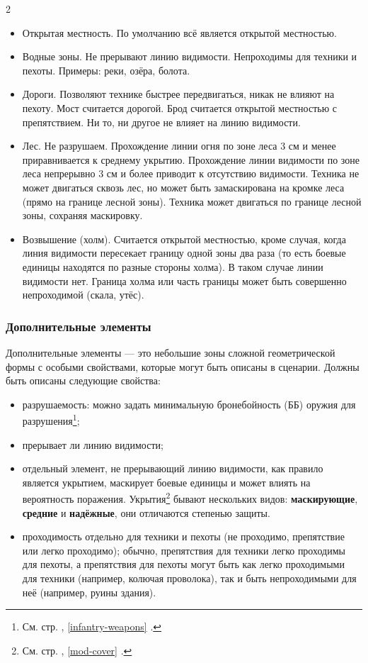 \documentclass[twoside]{article}
\begin{document}
\begin{multicols}{2}
\begin{itemize}
\item
  Открытая местность. По умолчанию всё является открытой местностью.
\item
  Водные зоны. Не прерывают линию видимости. Непроходимы для техники и
  пехоты. Примеры: реки, озёра, болота.
\item
  Дороги. Позволяют технике быстрее передвигаться, никак не влияют на
  пехоту. Мост считается дорогой. Брод считается открытой местностью с
  препятствием. Ни то, ни другое не влияет на линию видимости.
\item
  Лес. Не разрушаем. Прохождение линии огня по зоне леса 3 см и менее
  приравнивается к среднему укрытию. Прохождение линии
  видимости по зоне леса непрерывно 3 см и более приводит к отсутствию
  видимости. Техника не может двигаться сквозь лес, но может быть
  замаскирована на кромке леса (прямо на границе лесной зоны).
  Техника может двигаться по границе лесной зоны, сохраняя
  маскировку.
\item
  Возвышение (холм). Считается открытой местностью, кроме случая, когда
  линия видимости пересекает границу одной зоны два раза (то есть боевые
  единицы находятся по разные стороны холма). В таком случае линии
  видимости нет. Граница холма или часть границы может быть совершенно
  непроходимой (скала, утёс).
\end{itemize}

\subsubsection{Дополнительные элементы}\label{elements}

Дополнительные элементы --- это небольшие зоны сложной геометрической формы с особыми свойствами,
которые могут быть описаны в сценарии. Должны быть описаны следующие свойства:

\begin{itemize}
\item
  разрушаемость: можно задать минимальную бронебойность (ББ) оружия для
  разрушения\footnote{См. стр. \pageref{infantry-weapons}, \ref{infantry-weapons} .};
\item
  прерывает ли линию видимости;
\item
  отдельный элемент, не прерывающий линию видимости, как правило
  является укрытием, маскирует боевые единицы и может
  влиять на вероятность поражения. Укрытия\footnote{См. стр. \pageref{mod-cover}, \ref{mod-cover} .} бывают нескольких видов:
  \textbf{маскирующие}, \textbf{средние} и \textbf{надёжные}, они
  отличаются степенью защиты.
\item
  проходимость отдельно для техники и пехоты (не проходимо,
  препятствие или легко проходимо); обычно,
  препятствия для техники легко проходимы для пехоты, а
  препятствия для пехоты могут быть как легко проходимыми для
  техники (например, колючая проволока), так и быть непроходимыми для
  неё (например, руины здания).
\end{itemize}


\end{multicols}
\end{document}
